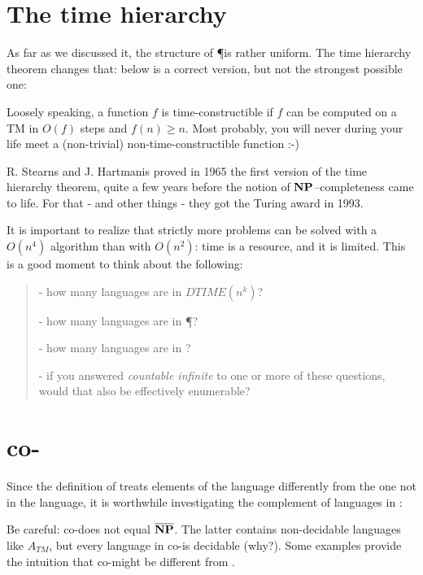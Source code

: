 \section{The time hierarchy}\label{timeshierarchie}

As far as we discussed it, the structure of \P is rather uniform.
The time hierarchy theorem changes that: below is a correct version,
but not the strongest possible one:


Loosely speaking, a function $f$ is time-constructible if $f$ can be
computed on a TM in $O(f)$ steps and $f(n) \geq n$. Most probably, you
will never during your life meet a (non-trivial)
non-time-constructible function :-)

R. Stearns and J. Hartmanis proved in 1965 the first version of the
time hierarchy theorem, quite a few years before the notion of
${\bf NP}$--completeness came to life. For that - and other things - they
got the Turing award in 1993.

It is important to realize that strictly more problems can be solved
with a $O(n^4)$ algorithm than with $O(n^2)$: time is a resource, and
it is limited. This is a good moment to think about the following:
\begin{verse}
- how many languages are in $DTIME(n^k)$?

- how many languages are in \P?

- how many languages are in \NP?

- if you answered {\em countable infinite} to one or more of these
questions, would that also be effectively enumerable?
\end{verse}


\section{co-\NP}

Since the definition of \NP treats elements of the language
differently from the one not in the language, it is worthwhile
investigating the complement of languages in \NP:


Be careful: co-\NP does not equal $\overline{{\bf NP}}$. The latter
contains non-decidable languages like $A_{TM}$, but every language in
co-\NP is decidable (why?). Some examples provide the intuition that
co-\NP might be different from \NP.

